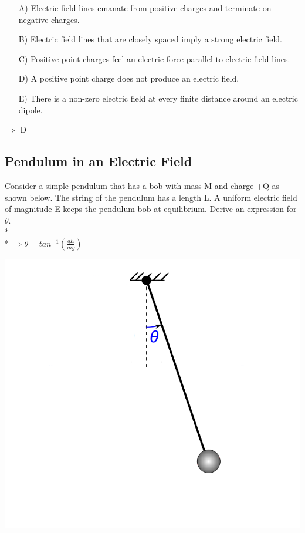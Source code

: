 \documentclass[11pt]{article}
\begin{document}
\begin{itemize}
	\item[A)] Electric field lines emanate from positive charges and terminate on negative charges.
	\item[B)] Electric field lines that are closely spaced imply a strong electric field.
	\item[C)] Positive point charges feel an electric force parallel to electric field lines.
	\item[D)] A positive point charge does not produce an electric field.
	\item[E)] There is a non-zero electric field at every finite distance around an electric dipole.
\end{itemize}
$\Rightarrow$ D

\pagebreak
\subsection{Pendulum in an Electric Field}
Consider a simple pendulum that has a bob with mass M and charge +Q as shown below.  The string of the pendulum has a length L.  A uniform electric field of magnitude E keeps the pendulum bob at equilibrium.  Derive an expression for $\theta$. \\* \\*
$\Rightarrow \theta = tan^{-1}(\frac{qE}{mg})$

\begin{center}
\includegraphics[scale=0.25]{Images/pendulum-efield.png}
\end{center}
\end{document}

